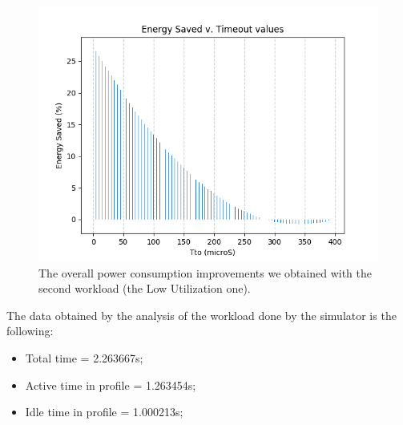 \documentclass[a4paper]{article}
\begin{document}
            \begin{figure}[htp]
                \centering
                \includegraphics[width=0.5 \columnwidth]{./screenshots/Idle_case2.png}
                \caption{
                        \label{fig:Idle_case2}
                        The overall power consumption improvements we obtained with the second workload (the Low Utilization one).
                }
            \end{figure}

            The data obtained by the analysis of the workload done by the simulator is the following:
            \begin{itemize}
                \item Total time = 2.263667s;
                \item Active time in profile = 1.263454s;
                \item Idle time in profile = 1.000213s;
            \end{itemize}
\end{document}
